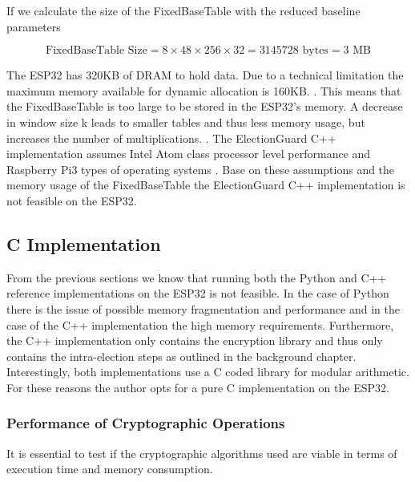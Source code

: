 If we calculate the size of the FixedBaseTable with the reduced baseline parameters

\begin{equation}
    \text{FixedBaseTable Size} = 8 \times 48 \times 256 \times 32 =  3145728 \text{ bytes} = 3 \text{ MB}
\end{equation}

The ESP32 has 320KB of DRAM to hold data. Due to a technical limitation the maximum memory available for dynamic allocation is 160KB. \cite{esp32-ref}. This means that the FixedBaseTable is too large to be stored in the ESP32's memory. A decrease in window size k leads to smaller tables and thus less memory usage, but increases the number of multiplications. \cite[22]{eg-spec}. The ElectionGuard C++ implementation assumes Intel Atom class processor level performance and Raspberry Pi3 types of operating systems \cite{eg-docs}. Base on these assumptions and the memory usage of the FixedBaseTable the ElectionGuard C++ implementation is not feasible on the ESP32.

\subsection{C Implementation}
From the previous sections we know that running both the Python and C++ reference implementations on the ESP32 is not feasible. In the case of Python there is the issue of possible memory fragmentation and performance and in the case of the C++ implementation the high memory requirements. Furthermore, the C++ implementation only contains the encryption library and thus only contains the intra-election steps as outlined in the background chapter. Interestingly, both implementations use a C coded library for modular arithmetic. For these reasons the author opts for a pure C implementation on the ESP32. 

\subsubsection{Performance of Cryptographic Operations}
It is essential to test if the cryptographic algorithms used are viable in terms of execution time and memory consumption.

